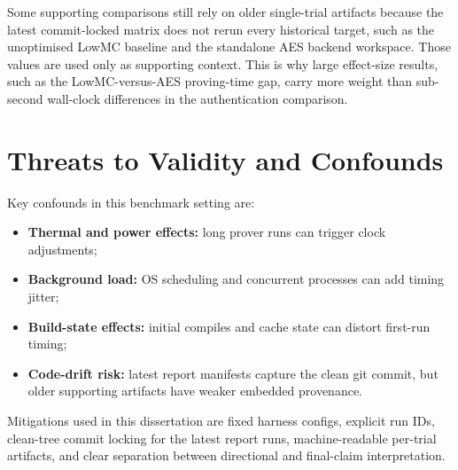 Some supporting comparisons still rely on older single-trial artifacts because
the latest commit-locked matrix does not rerun every historical target, such as
the unoptimised LowMC baseline and the standalone AES backend workspace. Those
values are used only as supporting context. This is why large effect-size results,
such as the LowMC-versus-AES proving-time gap, carry more weight than sub-second
wall-clock differences in the authentication comparison.

\section{Threats to Validity and Confounds}

Key confounds in this benchmark setting are:

\begin{itemize}
\item \textbf{Thermal and power effects:} long prover runs can trigger clock
adjustments;
\item \textbf{Background load:} OS scheduling and concurrent processes can add
timing jitter;
\item \textbf{Build-state effects:} initial compiles and cache state can distort
first-run timing;
\item \textbf{Code-drift risk:} latest report manifests capture the clean git
commit, but older supporting artifacts have weaker embedded provenance.
\end{itemize}

Mitigations used in this dissertation are fixed harness configs, explicit run
IDs, clean-tree commit locking for the latest report runs, machine-readable
per-trial artifacts, and clear separation between directional and final-claim
interpretation.
